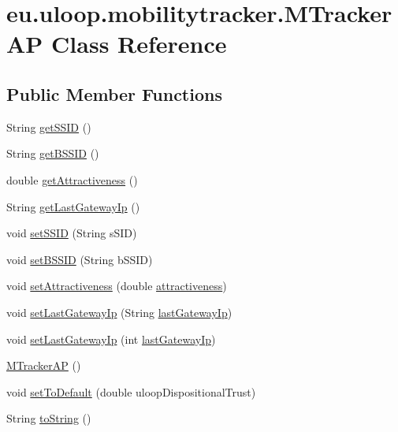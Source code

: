 \hypertarget{classeu_1_1uloop_1_1mobilitytracker_1_1MTrackerAP}{\section{eu.\+uloop.\+mobilitytracker.\+M\+Tracker\+A\+P Class Reference}
\label{classeu_1_1uloop_1_1mobilitytracker_1_1MTrackerAP}
}
\subsection*{Public Member Functions}
\begin{DoxyCompactItemize}
\item 
String \hyperlink{classeu_1_1uloop_1_1mobilitytracker_1_1MTrackerAP_a773c2889503a7bf8dd6468571280f0e9}{get\+S\+S\+I\+D} ()
\item 
String \hyperlink{classeu_1_1uloop_1_1mobilitytracker_1_1MTrackerAP_a81430f66ad88d53b3109c35e700d051e}{get\+B\+S\+S\+I\+D} ()
\item 
double \hyperlink{classeu_1_1uloop_1_1mobilitytracker_1_1MTrackerAP_ace5d72936022d4eb364a0a728e23d821}{get\+Attractiveness} ()
\item 
String \hyperlink{classeu_1_1uloop_1_1mobilitytracker_1_1MTrackerAP_a5ebfe543850723c6f0f6d928b8c91c83}{get\+Last\+Gateway\+Ip} ()
\item 
void \hyperlink{classeu_1_1uloop_1_1mobilitytracker_1_1MTrackerAP_ac3c8c048ff66a4552da92dd0d3c76749}{set\+S\+S\+I\+D} (String s\+S\+I\+D)
\item 
void \hyperlink{classeu_1_1uloop_1_1mobilitytracker_1_1MTrackerAP_a12ff31de9db1af6a1dc8e7fd7db5f5ea}{set\+B\+S\+S\+I\+D} (String b\+S\+S\+I\+D)
\item 
void \hyperlink{classeu_1_1uloop_1_1mobilitytracker_1_1MTrackerAP_aa9d709a1de1cdabc8459054ac871cec0}{set\+Attractiveness} (double \hyperlink{classeu_1_1uloop_1_1mobilitytracker_1_1MTrackerAP_a6dd4193c9a35b610e54d33f9b279439b}{attractiveness})
\item 
void \hyperlink{classeu_1_1uloop_1_1mobilitytracker_1_1MTrackerAP_a3bf426641e7bf18589a492e5c8b86dd8}{set\+Last\+Gateway\+Ip} (String \hyperlink{classeu_1_1uloop_1_1mobilitytracker_1_1MTrackerAP_a6c4d27c182eac0aaba0de6f2a7c9c109}{last\+Gateway\+Ip})
\item 
void \hyperlink{classeu_1_1uloop_1_1mobilitytracker_1_1MTrackerAP_a3ae2f392f79b6957a1d5166ddd0a7990}{set\+Last\+Gateway\+Ip} (int \hyperlink{classeu_1_1uloop_1_1mobilitytracker_1_1MTrackerAP_a6c4d27c182eac0aaba0de6f2a7c9c109}{last\+Gateway\+Ip})
\item 
\hyperlink{classeu_1_1uloop_1_1mobilitytracker_1_1MTrackerAP_ad06da8a427b80f62e1fe05cecba3e0de}{M\+Tracker\+A\+P} ()
\item 
void \hyperlink{classeu_1_1uloop_1_1mobilitytracker_1_1MTrackerAP_a1ff1a92308cc59b93a3ff82540e658eb}{set\+To\+Default} (double uloop\+Dispositional\+Trust)
\item 
String \hyperlink{classeu_1_1uloop_1_1mobilitytracker_1_1MTrackerAP_a67b5859a4ec4beeeb20e8d4f3cf5165f}{to\+String} ()
\end{DoxyCompactItemize}
